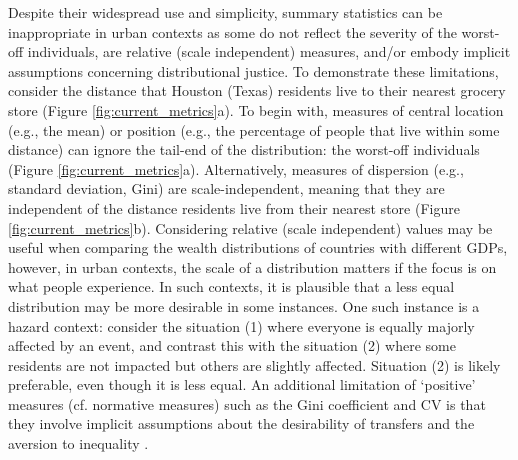 \documentclass[final,3p,times,onecolumn,sort&compress]{elsarticle}
\begin{document}
Despite their widespread use and simplicity, summary statistics can be inappropriate in urban contexts as some do not reflect the severity of the worst-off individuals, are relative (scale independent) measures, and/or embody implicit assumptions concerning distributional justice. 
To demonstrate these limitations, consider the distance that Houston (Texas) residents live to their nearest grocery store (Figure \ref{fig:current_metrics}a). 
To begin with, measures of central location (e.g., the mean) or position (e.g., the percentage of people that live within some distance) can ignore the tail-end of the distribution: the worst-off individuals (Figure \ref{fig:current_metrics}a). 
Alternatively, measures of dispersion (e.g., standard deviation, Gini) are scale-independent, meaning that they are independent of the distance residents live from their nearest store (Figure \ref{fig:current_metrics}b).
Considering relative (scale independent) values may be useful when comparing the wealth distributions of countries with different GDPs, however, in urban contexts, the scale of a distribution matters if the focus is on what people experience. 
In such contexts, it is plausible that a less equal distribution may be more desirable in some instances.
One such instance is a hazard context: consider the situation (1) where everyone is equally majorly affected by an event, and contrast this with the situation (2) where some residents are not impacted but others are slightly affected.
Situation (2) is likely preferable, even though it is less equal.
An additional limitation of ‘positive’ measures (cf. normative measures) such as the Gini coefficient and CV is that they involve implicit assumptions about the desirability of transfers and the aversion to inequality \citep{Maguire2011-fi, Atkinson1970-mr, Adger1997-tu}.
\end{document}
